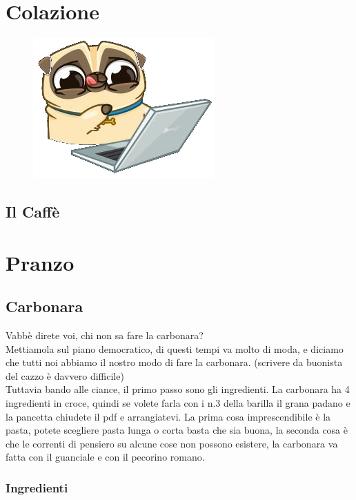 

\chapter{Colazione}

\begin{figure}
\centering
  \includegraphics[width=.3\textwidth]{fig/carlino.png}
\caption{}
\label{}
\end{figure}

\section{Il Caffè}

\chapter{Pranzo}

\section{Carbonara}

Vabbè direte voi, chi non sa fare la carbonara?\\
Mettiamola sul piano democratico, di questi tempi va molto di moda, e diciamo che tutti noi abbiamo il nostro modo di fare la carbonara. (scrivere da buonista del cazzo è davvero difficile)\\
Tuttavia bando alle ciance, il primo passo sono gli ingredienti. La carbonara ha 4 ingredienti in croce, quindi se volete farla con i n.3 della barilla il grana padano e la pancetta chiudete il pdf e arrangiatevi. La prima cosa imprescendibile è la pasta, potete scegliere pasta lunga o corta basta che sia buona, la seconda cosa è che le correnti di pensiero su alcune cose non possono esistere, la carbonara va fatta con il guanciale e con il pecorino romano.

\subsection{Ingredienti}


